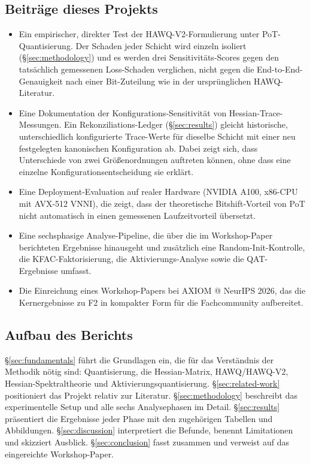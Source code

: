\subsection{Beiträge dieses Projekts}

\begin{itemize}
\item Ein empirischer, direkter Test der HAWQ-V2-Formulierung unter PoT-Quantisierung. Der Schaden jeder Schicht wird einzeln isoliert (\S\ref{sec:methodology}) und es werden drei Sensitivitäts-Scores gegen den tatsächlich gemessenen Loss-Schaden verglichen, nicht gegen die End-to-End-Genauigkeit nach einer Bit-Zuteilung wie in der ursprünglichen HAWQ-Literatur.
\item Eine Dokumentation der Konfigurations-Sensitivität von Hessian-Trace-Messungen. Ein Rekonziliations-Ledger (\S\ref{sec:results}) gleicht historische, unterschiedlich konfigurierte Trace-Werte für dieselbe Schicht mit einer neu festgelegten kanonischen Konfiguration ab. Dabei zeigt sich, dass Unterschiede von zwei Größenordnungen auftreten können, ohne dass eine einzelne Konfigurationsentscheidung sie erklärt.
\item Eine Deployment-Evaluation auf realer Hardware (NVIDIA A100, x86-CPU mit AVX-512 VNNI), die zeigt, dass der theoretische Bitshift-Vorteil von PoT nicht automatisch in einen gemessenen Laufzeitvorteil übersetzt.
\item Eine sechsphasige Analyse-Pipeline, die über die im Workshop-Paper berichteten Ergebnisse hinausgeht und zusätzlich eine Random-Init-Kontrolle, die KFAC-Faktorisierung, die Aktivierungs-Analyse sowie die QAT-Ergebnisse umfasst.
\item Die Einreichung eines Workshop-Papers bei AXIOM @ NeurIPS 2026, das die Kernergebnisse zu F2 in kompakter Form für die Fachcommunity aufbereitet.
\end{itemize}

\subsection{Aufbau des Berichts}

\S\ref{sec:fundamentals} führt die Grundlagen ein, die für das Verständnis der Methodik nötig sind: Quantisierung, die Hessian-Matrix, HAWQ/HAWQ-V2, Hessian-Spektraltheorie und Aktivierungsquantisierung. \S\ref{sec:related-work} positioniert das Projekt relativ zur Literatur. \S\ref{sec:methodology} beschreibt das experimentelle Setup und alle sechs Analysephasen im Detail. \S\ref{sec:results} präsentiert die Ergebnisse jeder Phase mit den zugehörigen Tabellen und Abbildungen. \S\ref{sec:discussion} interpretiert die Befunde, benennt Limitationen und skizziert Ausblick. \S\ref{sec:conclusion} fasst zusammen und verweist auf das eingereichte Workshop-Paper.